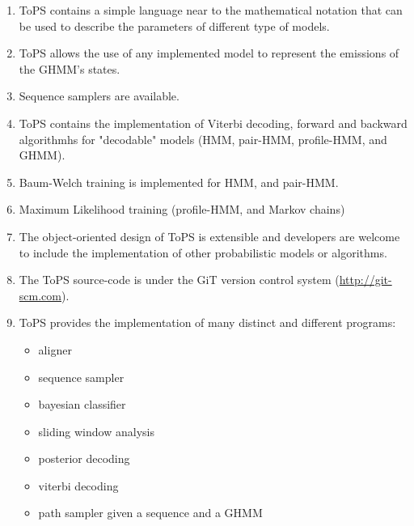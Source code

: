 \begin{enumerate}
\item ToPS contains a simple language near to the mathematical notation that can be used to describe the parameters of different type of models. 
\item ToPS allows the use of any implemented model to represent the emissions of the GHMM's states. 
\item Sequence samplers are available. 
\item ToPS contains the implementation of Viterbi decoding, forward and backward algorithmhs for "decodable" models (HMM, pair-HMM, profile-HMM, and GHMM).
\item Baum-Welch training is implemented for HMM, and pair-HMM.
\item Maximum Likelihood training (profile-HMM, and Markov chains)
\item The object-oriented design of ToPS is extensible and developers are welcome to include the implementation of other probabilistic models or algorithms.
\item The ToPS source-code is under the GiT version control system (\url{http://git-scm.com}). 
\item ToPS provides the implementation of many distinct and different programs:
\begin{itemize}
\item aligner
\item sequence sampler
\item bayesian classifier
\item sliding window analysis
\item posterior decoding
\item viterbi decoding
\item path sampler given a sequence and a GHMM
\end{itemize}

\end{enumerate}

